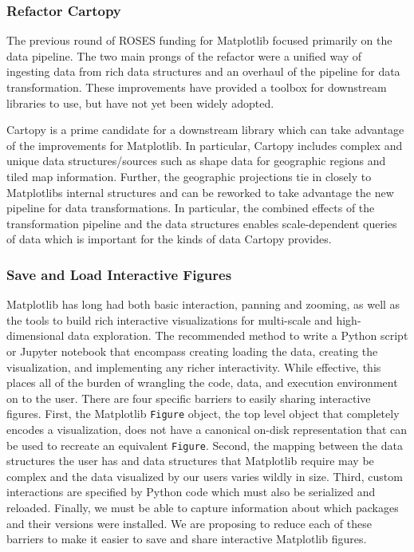 \documentclass[12pt]{article}
\numberwithin{page}{section}
\begin{document}
\subsubsection{Refactor Cartopy}

The previous round of ROSES funding for Matplotlib focused primarily on the data pipeline.
The two main prongs of the refactor were a unified way of ingesting data from rich data structures and an overhaul of the pipeline for data transformation.
These improvements have provided a toolbox for downstream libraries to use, but have not yet been widely adopted.

Cartopy is a prime candidate for a downstream library which can take advantage of the improvements for Matplotlib.
In particular, Cartopy includes complex and unique data structures/sources such as shape data for geographic regions and tiled map information.
Further, the geographic projections tie in closely to Matplotlibs internal structures and can be reworked to take advantage the new pipeline for data transformations.
In particular, the combined effects of the transformation pipeline and the data structures enables scale-dependent queries of data which is important for the kinds of data Cartopy provides.



\subsubsection{Save and Load Interactive Figures}
Matplotlib has long had both basic interaction, panning and zooming, as well as
the tools to build rich interactive visualizations for multi-scale and
high-dimensional data exploration.  The recommended method to write a Python
script or Jupyter notebook that encompass creating loading the data, creating
the visualization, and implementing any richer interactivity.  While effective,
this places all of the burden of wrangling the code, data, and execution
environment on to the user.  There are four specific barriers to easily sharing
interactive figures.  First, the Matplotlib \texttt{Figure} object, the top
level object that completely encodes a visualization, does not have a canonical
on-disk representation that can be used to recreate an equivalent
\texttt{Figure}.  Second, the mapping between the data structures the user has
and data structures that Matplotlib require may be complex and the data
visualized by our users varies wildly in size.  Third, custom interactions are
specified by Python code which must also be serialized and reloaded. Finally,
we must be able to capture information about which packages and their versions
were installed.  We are proposing to reduce each of these barriers to make it
easier to save and share interactive Matplotlib figures.
\end{document}
